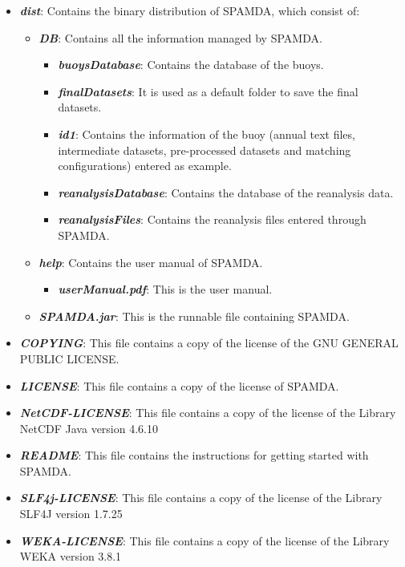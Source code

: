 \begin{onehalfspace}
					\begin{itemize}
						\item \textbf{\textit{dist}}: Contains the binary distribution of SPAMDA, which consist of:
							\begin{itemize}
								\item \textbf{\textit{DB}}: Contains all the information managed by SPAMDA.
									\begin{itemize}
										\item \textbf{\textit{buoysDatabase}}: Contains the database of the buoys.
										\item \textbf{\textit{finalDatasets}}: It is used as a default folder to save the final datasets.
										\item \textbf{\textit{id1}}: Contains the information of the buoy (annual text files, intermediate datasets, pre-processed datasets and matching configurations) entered as example.
										\item \textbf{\textit{reanalysisDatabase}}: Contains the database of the reanalysis data.
										\item \textbf{\textit{reanalysisFiles}}: Contains the reanalysis files entered through SPAMDA.
									\end{itemize}
								\item \textbf{\textit{help}}: Contains the user manual of SPAMDA.
									\begin{itemize}
										\item \textbf{\textit{userManual.pdf}}: This is the user manual.
									\end{itemize}
								\item \textbf{\textit{SPAMDA.jar}}: This is the runnable file containing SPAMDA.
							\end{itemize}
						\item \textbf{\textit{COPYING}}: This file contains a copy of the license of the GNU GENERAL PUBLIC LICENSE.
						\item \textbf{\textit{LICENSE}}: This file contains a copy of the license of SPAMDA.
						\item \textbf{\textit{NetCDF-LICENSE}}: This file contains a copy of the license of the Library NetCDF Java version 4.6.10
						\item \textbf{\textit{README}}: This file contains the instructions for getting started with SPAMDA.
						\item \textbf{\textit{SLF4j-LICENSE}}: This file contains a copy of the license of the Library SLF4J version 1.7.25
						\item \textbf{\textit{WEKA-LICENSE}}: This file contains a copy of the license of the Library WEKA version 3.8.1
					\end{itemize}
				

\end{onehalfspace}
